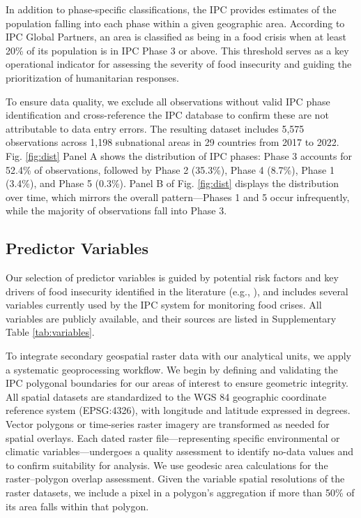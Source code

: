 \documentclass[pdflatex,sn-mathphys-num]{sn-jnl}%
\theoremstyle{thmstyleone}%
\theoremstyle{thmstyletwo}%
\theoremstyle{thmstylethree}%
\begin{document}
In addition to phase-specific classifications, the IPC provides estimates of the population falling into each phase within a given geographic area. According to IPC Global Partners, an area is classified as being in a food crisis when at least 20\% of its population is in IPC Phase 3 or above. This threshold serves as a key operational indicator for assessing the severity of food insecurity and guiding the prioritization of humanitarian responses.

To ensure data quality, we exclude all observations without valid IPC phase identification and cross-reference the IPC database to confirm these are not attributable to data entry errors. The resulting dataset includes 5,575 observations across 1,198 subnational areas in 29 countries from 2017 to 2022. Fig. \ref{fig:dist} Panel A shows the distribution of IPC phases: Phase 3 accounts for 52.4\% of observations, followed by Phase 2 (35.3\%), Phase 4 (8.7\%), Phase 1 (3.4\%), and Phase 5 (0.3\%). Panel B of Fig. \ref{fig:dist} displays the distribution over time, which mirrors the overall pattern—Phases 1 and 5 occur infrequently, while the majority of observations fall into Phase 3.


\subsection*{Predictor Variables}

Our selection of predictor variables is guided by potential risk factors and key drivers of food insecurity identified in the literature (e.g., \cite{browne2021covid}), and includes several variables currently used by the IPC system for monitoring food crises. All variables are publicly available, and their sources are listed in Supplementary Table \ref{tab:variables}.

To integrate secondary geospatial raster data with our analytical units, we apply a systematic geoprocessing workflow. We begin by defining and validating the IPC polygonal boundaries for our areas of interest to ensure geometric integrity. All spatial datasets are standardized to the WGS 84 geographic coordinate reference system (EPSG:4326), with longitude and latitude expressed in degrees. Vector polygons or time-series raster imagery are transformed as needed for spatial overlays. Each dated raster file—representing specific environmental or climatic variables—undergoes a quality assessment to identify no-data values %
and to confirm suitability for analysis. We use geodesic area calculations for the raster--polygon overlap assessment. Given the variable spatial resolutions of the raster datasets, we include a pixel in a polygon’s aggregation if more than 50\% of its area falls within that polygon.
\end{document}
